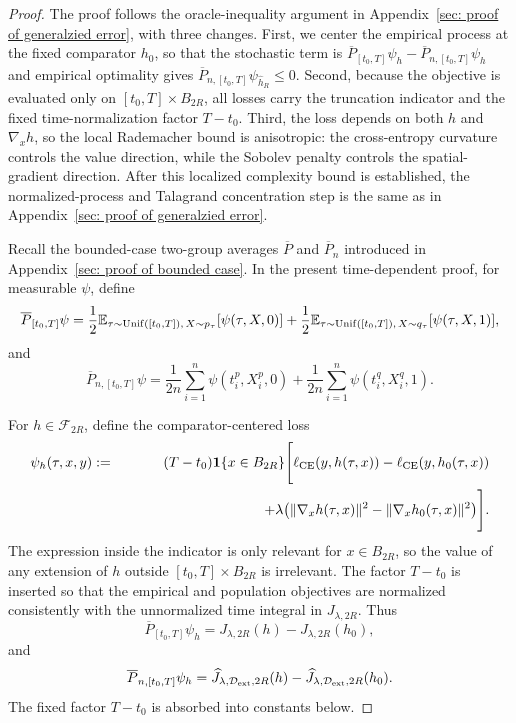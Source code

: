 \documentclass[11pt]{article}
\newcommand{\E}{\mathbb{E}}
\theoremstyle{plain}
\theoremstyle{definition}
\theoremstyle{remark}
\begin{document}
\begin{proof}
The proof follows the oracle-inequality argument in
Appendix~\ref{sec: proof of generalzied error}, with three changes. First,
we center the empirical process at the fixed comparator \(h_0\), so that
the stochastic term is \(\overline P_{[t_0,T]}\psi_h-\overline P_{n,[t_0,T]}\psi_h\) and empirical optimality gives
\(\overline P_{n,[t_0,T]}\psi_{\widehat h_R}\le0\). Second, because the objective is evaluated
only on \([t_0,T]\times B_{2R}\), all losses carry the truncation indicator
and the fixed time-normalization factor \(T-t_0\). Third, the loss depends on
both \(h\) and \(\nabla_xh\), so the local Rademacher bound is anisotropic:
the cross-entropy curvature controls the value direction, while the Sobolev
penalty controls the spatial-gradient direction. After this localized
complexity bound is established, the normalized-process and Talagrand
concentration step is the same as in Appendix~\ref{sec: proof of generalzied error}.

Recall the bounded-case two-group averages \(\overline P\) and
\(\overline P_n\) introduced in Appendix~\ref{sec: proof of bounded case}. In the present time-dependent
proof, for measurable \(\psi\), define
\[
\overline P_{[t_0,T]}\psi =
\frac12\E_{\tau\sim{\rm Unif}([t_0,T]),\,X\sim p_\tau}[\psi(\tau,X,0)]
+
\frac12\E_{\tau\sim{\rm Unif}([t_0,T]),\,X\sim q_\tau}[\psi(\tau,X,1)],
\]
and
\[
\overline P_{n,[t_0,T]}\psi =
\frac1{2n}\sum_{i=1}^n\psi(t_i^p,X_i^p,0)
+
\frac1{2n}\sum_{i=1}^n\psi(t_i^q,X_i^q,1).
\]

For \(h\in\mathcal F_{2R}\), define the comparator-centered loss
\begin{eqnarray}\label{eq: time-dependent-comparator-centered loss}
    \psi_h(\tau,x,y) &:=&
(T-t_0)\mathbf 1\{x\in B_{2R}\}
\Bigg[
\ell_{\rm CE}(y,h(\tau,x))
-
\ell_{\rm CE}(y,h_0(\tau,x))\nonumber\\
&& \qquad\qquad\qquad \qquad\qquad+
\lambda\big(
\|\nabla_xh(\tau,x)\|^2
-
\|\nabla_xh_0(\tau,x)\|^2
\big)
\Bigg].
\end{eqnarray}
The expression inside the indicator is only relevant for \(x\in B_{2R}\),
so the value of any extension of \(h\) outside \([t_0,T]\times B_{2R}\) is irrelevant.
The factor \(T-t_0\) is inserted so that the empirical and population
objectives are normalized consistently with the unnormalized time integral
in \(J_{\lambda,2R}\). Thus
\[
\overline P_{[t_0,T]}\psi_h
=
J_{\lambda,2R}(h)-J_{\lambda,2R}(h_0),
\]
and
\[
\overline P_{n,[t_0,T]}\psi_h
=
\widehat J_{\lambda,\mathcal D_{\rm ext},2R}(h)
-
\widehat J_{\lambda,\mathcal D_{\rm ext},2R}(h_0).
\]
The fixed factor \(T-t_0\) is absorbed into constants below.


\end{proof}
\end{document}
